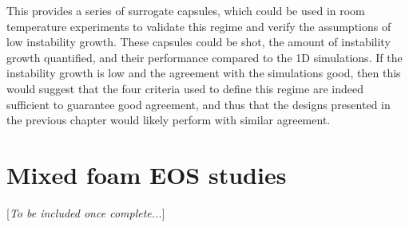 This provides a series of surrogate capsules, which could be used in room temperature experiments to validate this regime and verify the assumptions of low instability growth. These capsules could be shot, the amount of instability growth quantified, and their performance compared to the 1D simulations. If the instability growth is low and the agreement with the simulations good, then this would suggest that the four criteria used to define this regime are indeed sufficient to guarantee good agreement, and thus that the designs presented in the previous chapter would likely perform with similar agreement. 

\section{Mixed foam EOS studies} \label{sec:MixedEOS}

[\textit{To be included once complete...}]




